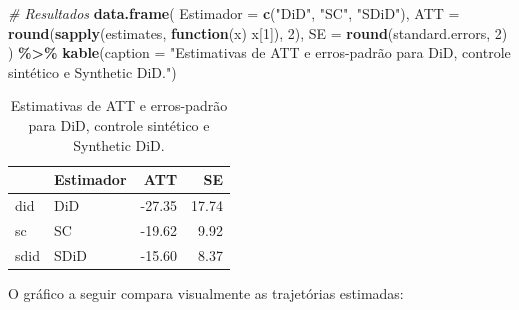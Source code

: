 \documentclass[
]{article}
\newenvironment{Shaded}{\begin{snugshade}}{\end{snugshade}}
\newcommand{\AttributeTok}[1]{\textcolor[rgb]{0.13,0.29,0.53}{#1}}
\newcommand{\CommentTok}[1]{\textcolor[rgb]{0.56,0.35,0.01}{\textit{#1}}}
\newcommand{\ControlFlowTok}[1]{\textcolor[rgb]{0.13,0.29,0.53}{\textbf{#1}}}
\newcommand{\DecValTok}[1]{\textcolor[rgb]{0.00,0.00,0.81}{#1}}
\newcommand{\FunctionTok}[1]{\textcolor[rgb]{0.13,0.29,0.53}{\textbf{#1}}}
\newcommand{\NormalTok}[1]{#1}
\newcommand{\SpecialCharTok}[1]{\textcolor[rgb]{0.81,0.36,0.00}{\textbf{#1}}}
\newcommand{\StringTok}[1]{\textcolor[rgb]{0.31,0.60,0.02}{#1}}
\begin{document}
\begin{Shaded}
\begin{Highlighting}[]
\CommentTok{\# Resultados}
\FunctionTok{data.frame}\NormalTok{(}
  \AttributeTok{Estimador =} \FunctionTok{c}\NormalTok{(}\StringTok{"DiD"}\NormalTok{, }\StringTok{"SC"}\NormalTok{, }\StringTok{"SDiD"}\NormalTok{),}
  \AttributeTok{ATT =} \FunctionTok{round}\NormalTok{(}\FunctionTok{sapply}\NormalTok{(estimates, }\ControlFlowTok{function}\NormalTok{(x) x[}\DecValTok{1}\NormalTok{]), }\DecValTok{2}\NormalTok{),}
  \AttributeTok{SE =} \FunctionTok{round}\NormalTok{(standard.errors, }\DecValTok{2}\NormalTok{)}
\NormalTok{) }\SpecialCharTok{\%\textgreater{}\%}
  \FunctionTok{kable}\NormalTok{(}\AttributeTok{caption =} \StringTok{"Estimativas de ATT e erros{-}padrão para DiD, controle sintético e Synthetic DiD."}\NormalTok{)}
\end{Highlighting}
\end{Shaded}

\begin{table}

\caption{\label{tab:sdid}Estimativas de ATT e erros-padrão para DiD, controle sintético e Synthetic DiD.}
\centering
\begin{tabular}[t]{l|l|r|r}
\hline
  & Estimador & ATT & SE\\
\hline
did & DiD & -27.35 & 17.74\\
\hline
sc & SC & -19.62 & 9.92\\
\hline
sdid & SDiD & -15.60 & 8.37\\
\hline
\end{tabular}
\end{table}

O gráfico a seguir compara visualmente as trajetórias estimadas:
\end{document}
